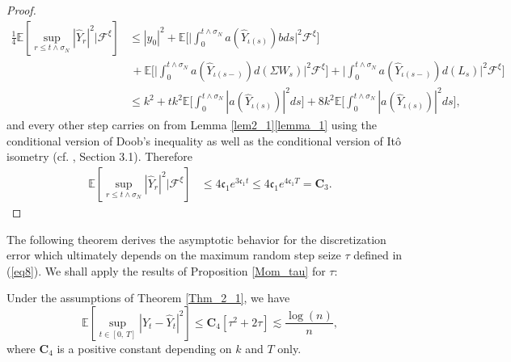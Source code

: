 \begin{proof}
\begin{equation*} 
    \begin{split}
     \frac{1}{4} \mathbb{E}[\sup_{r \leq t  \land \sigma_N}|\hat{Y}_r|^2|\mathcal{F}^{\xi}] &\leq  |y_0|^2 +\mathbb{E} \bigg[ \bigg|\int^{t \land \sigma_N}_{0} a(\hat{Y}_{\iota(s)})bds \bigg|^2\mathcal{F}^{\xi} \bigg] \\
      &\,+ \mathbb{E} \bigg[ \bigg|\int^{t \land \sigma_N}_{0}a(\hat{Y}_{\iota(s-)})d(\Sigma W_s)\bigg|^2\mathcal{F}^{\xi} \bigg] +\bigg|\int^{t \land \sigma_N}_{0}a(\hat{Y}_{\iota(s-)})d(L_s) \bigg|^2\mathcal{F}^{\xi} \bigg] \\
        &\leq k^2 + tk^2 \mathbb{E}\bigg[\int^{t \land \sigma_N}_{0} |a(\hat{Y}_{\iota(s)})|^2ds \bigg] + 8k^2 \mathbb{E}\bigg[\int^{t \land \sigma_N}_{0} |a(\hat{Y}_{\iota(s)})|^2ds \bigg],
    \end{split}
\end{equation*}
and every other step carries on from Lemma \ref{lem2_1}\ref{lemma_1} using the conditional version of Doob's inequality  as well as the conditional version of It\^o isometry (cf. , Section 3.1). Therefore
\begin{equation*}
    \begin{aligned}
         \mathbb{E}[\sup_{r \leq t  \land \sigma_N}|\hat{Y}_r|^2|\mathcal{F}^{\xi}]  &\leq 4\mathfrak{c}_1e^{3\mathfrak{c}_1t} \leq 4\mathfrak{c}_1e^{4\mathfrak{c}_1T} = \mathbf{C}_3.
    \end{aligned}
\end{equation*}
\end{proof}
The following theorem derives the asymptotic behavior for the discretization error which ultimately depends on the maximum random step seize $\tau$ defined in (\ref{eq8}). We shall apply the results of Proposition \ref{Mom_tau} for $\tau$:
\begin{theorem}\label{Thm3_2}
    Under the assumptions of Theorem \ref{Thm_2_1}, we have 
    \begin{equation*}
        \mathbb{E}[\sup_{t \in [0, \, T]} |Y_t - \hat{Y}_{t}|^2] \leq \mathbf{C}_4 [\tau^2 + 2 \tau] \lesssim \frac{\log(n)}{n},
    \end{equation*}
    where $\mathbf{C}_4$ is a positive constant depending on $k$ and $T$ only.
\end{theorem}
